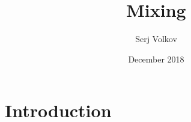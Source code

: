 \documentclass{article}
\title{Mixing}
\author{Serj Volkov}
\date{December 2018}
\begin{document}
\maketitle

\section{Introduction}
\end{document}
